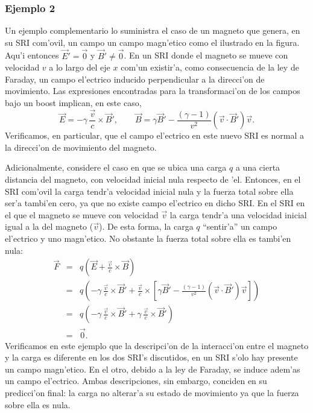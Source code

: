 \subsubsection{Ejemplo 2}
Un ejemplo complementario lo suministra el caso de un magneto que genera, en su SRI com'ovil, un campo un campo magn'etico como el ilustrado en la figura. Aqu'i entonces $\vec{E}'=\vec{0}$ y $\vec{B}'\neq\vec{0}$. En un SRI donde el magneto se mueve con velocidad $v$ a lo largo del eje $x$ com'un existir'a, como consecuencia de la ley de Faraday, un campo el'ectrico inducido perpendicular a la direcci'on de movimiento. Las expresiones encontradas para la transformaci'on de los campos bajo un boost implican, en este caso,
\begin{equation}
 \vec{E}=-\gamma\, \frac{\vec{v}}{c}\times\vec{B}', \qquad
\vec{B}=\gamma \vec{B}'-\frac{(\gamma -1)}{v^2}\left( \vec{v}\cdot
\vec{B}'\right) \vec{v}.
\end{equation}
Verificamos, en particular, que el campo el'ectrico en este nuevo SRI es normal a la direcci'on de movimiento del magneto.

Adicionalmente, considere el caso en que se ubica una carga $q$ a una cierta distancia del magneto, con velocidad inicial nula respecto de 'el. Entonces, en el SRI com'ovil la carga tendr'a velocidad inicial nula y la fuerza total sobre ella ser'a tambi'en cero, ya que no existe campo el'ectrico en dicho SRI. En el SRI en el que el magneto se mueve con velocidad $\vec{v}$ la carga tendr'a una velocidad inicial igual a la del magneto ($\vec{v}$). De esta forma, la carga $q$ ``sentir'a'' un campo el'ectrico y uno magn'etico. No obstante la fuerza total sobre ella es tambi'en nula:
\begin{eqnarray}
\vec{F}&=&q\left(\vec{E}+\frac{\vec{v}}{c}\times\vec{B}\right) \\
&=&q\left(-\gamma\, \frac{\vec{v}}{c}\times\vec{B}'+\frac{\vec{v}}{c}\times\left[\gamma \vec{B}'-\frac{(\gamma -1)}{v^2}\left( \vec{v}\cdot
\vec{B}'\right) \vec{v}\right]\right)\\
&=&q\left(-\gamma\, \frac{\vec{v}}{c}\times\vec{B}'+\gamma\, \frac{\vec{v}}{c}\times\vec{B}'\right)\\
&=&\vec{0}.
\end{eqnarray}
Verificamos en este ejemplo que la descripci'on de la interacci'on entre el magneto y la carga es diferente en los dos SRI's discutidos, en un SRI s'olo hay presente un campo magn'etico. En el otro, debido a la ley de Faraday, se induce adem'as un campo el'ectrico. Ambas descripciones, sin embargo, conciden en su predicci'on final: la carga no alterar'a su estado de movimiento ya que la fuerza sobre ella es nula.


